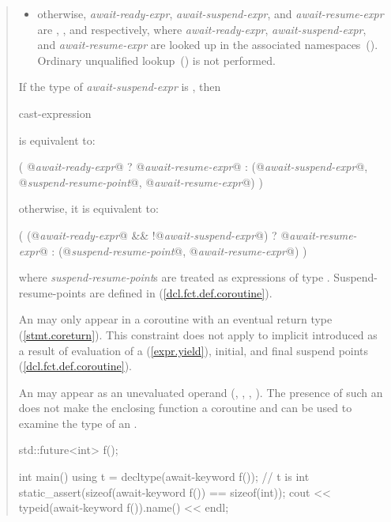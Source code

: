 \begin{quote}
\begin{itemize}
  \item otherwise, \textit{await-ready-expr}, \textit{await-suspend-expr}, and \textit{await-resume-expr} are 
  , 
  , and  
  respectively, where 
  \textit{await-ready-expr}, \textit{await-suspend-expr}, and \textit{await-resume-expr} are 
  looked up in the associated namespaces~().
  \enternote Ordinary unqualified lookup~() is not
  performed. \exitnote
\end{itemize}

If the type of \textit{await-suspend-expr} is \cvvoid, then

\begin{ncbnf}
   cast-expression
\end{ncbnf}
is equivalent to:
\begin{codeblock}
(
    @\textit{await-ready-expr}@ ? @\textit{await-resume-expr}@
    : (@\textit{await-suspend-expr}@, @\textit{suspend-resume-point}@, @\textit{await-resume-expr}@)
)
\end{codeblock}

otherwise, it is equivalent to:

\begin{codeblock}
(
    (@\textit{await-ready-expr}@ && !@\textit{await-suspend-expr}@) ? @\textit{await-resume-expr}@
    : (@\textit{suspend-resume-point}@, @\textit{await-resume-expr}@)
)
\end{codeblock}

where \textit{suspend-resume-point}s are treated as  expressions of type . Suspend-resume-points are defined in (\ref{dcl.fct.def.coroutine}).

\pnum
An  may only appear in a coroutine 
with an eventual return type (\ref{stmt.coreturn}). This constraint does not apply to implicit  introduced as a result of evaluation of a  (\ref{expr.yield}), initial, and final suspend points (\ref{dcl.fct.def.coroutine}).

\pnum
\enternote
An  may appear as an unevaluated operand (, , , ). The presence of such an  does not make the enclosing function a coroutine and can be used to examine the type of an .

\enterexample
\begin{codeblock}	
  std::future<int> f();
  
  int main() {
    using t = decltype(await-keyword f()); // t is int
    static_assert(sizeof(await-keyword f()) == sizeof(int));
    cout << typeid(await-keyword f()).name() << endl;
  }
\end{codeblock}
\exitexample%
\exitnote

\end{quote}
